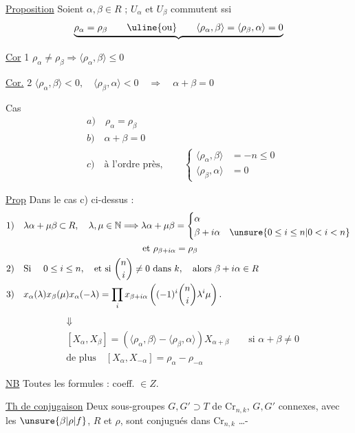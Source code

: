 \uline{Proposition} Soient $\alpha,\beta\in R$ ; $U_\alpha$ et $U_\beta$ commutent ssi
\[
\underbrace{\rho_\alpha=\rho_\beta\qquad\text{\uline{ou}}\qquad
\langle\rho_\alpha,\beta\rangle=\langle\rho_\beta,\alpha\rangle=0}
\]

\uline{Cor} 1 \quad $\rho_\alpha\neq\rho_\beta\Longrightarrow\langle\rho_\alpha,\beta\rangle\leq0$

\uline{Cor.} 2 \quad $\langle\rho_\alpha,\beta\rangle<0,\quad\langle\rho_\beta,\alpha\rangle<0\quad\Longrightarrow\quad\alpha+\beta=0$


Cas
\[
\begin{aligned}
&a)\quad\rho_\alpha=\rho_\beta\\
&b)\quad\alpha+\beta=0\\
&c)\quad\text{à l'ordre près},\qquad
\left\{\begin{aligned}\langle\rho_\alpha,\beta\rangle&=-n\leq0\\
\langle\rho_\beta,\alpha\rangle&=0\end{aligned}\right.
\end{aligned}
\]

\uline{Prop} Dans le cas c) ci-dessus :
\[
\begin{aligned}
1)\quad &\lambda\alpha+\mu\beta\mathbin{\subset}R,\quad\lambda,\mu\in\mathbb N
 \Longrightarrow\lambda\alpha+\mu\beta=
 \left\{\begin{aligned}&\alpha\\&\beta+i\alpha\quad\unsure{0\leq i\leq n|0<i<n}\end{aligned}\right.\\
&\hspace{13em}\text{et }\rho_{\beta+i\alpha}=\rho_\beta\\
2)\quad &\text{Si }\quad 0\leq i\leq n,\quad\text{et si }\binom ni\neq0\ \text{dans }k,\quad
\text{alors }\beta+i\alpha\in R\\
3)\quad &x_\alpha(\lambda)x_\beta(\mu)x_\alpha(-\lambda)=
 \prod_i x_{\beta+i\alpha}\left((-1)^i\binom ni\lambda^i\mu\right).
\end{aligned}
\]
\[
\begin{aligned}
&\Downarrow\\
&[X_\alpha,X_\beta]=(\langle\rho_\alpha,\beta\rangle-\langle\rho_\beta,\alpha\rangle)X_{\alpha+\beta}
 \qquad\text{si }\alpha+\beta\neq0\\
&\text{de plus}\quad[X_\alpha,X_{-\alpha}]=\rho_\alpha-\rho_{-\alpha}
\end{aligned}
\]

\uline{NB} Toutes les formules : coeff. $\in Z$.

\uline{Th de conjugaison} Deux sous-groupes $G,G'\supset T$ de $\mathrm{Cr}_{n,k}$,  $G,G'$ connexes, avec les  $\unsure{\beta|\rho|f}$, $R$ et $\rho$, sont conjugués dans $\mathrm{Cr}_{n,k}$ \ldots-

